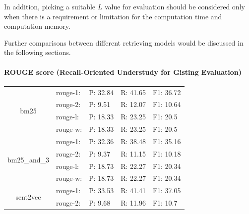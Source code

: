 \documentclass[10pt,a4paper,fleqn]{report}
\begin{document}
					In addition, picking a suitable $L$ value for evaluation should be considered only when there is a requirement or limitation for the computation time and computation memory. 
					
					Further comparisons between different retrieving models would be discussed in the following sections.
				
				\paragraph{ROUGE score (Recall-Oriented Understudy for Gisting Evaluation) }
				
					\begin{table}[htbp]
						\centering
						\begin{tabular}{crrrr}
							\toprule
							\multirow{4}[2]{*}{bm25} & \multicolumn{1}{l}{rouge-1:} & \multicolumn{1}{l}{P: 32.84} & \multicolumn{1}{l}{R: 41.65} & \multicolumn{1}{l}{F1: 36.72} \\
							& \multicolumn{1}{l}{rouge-2:} & \multicolumn{1}{l}{P: 9.51} & \multicolumn{1}{l}{R: 12.07} & \multicolumn{1}{l}{F1: 10.64} \\
							& \multicolumn{1}{l}{rouge-l:} & \multicolumn{1}{l}{P: 18.33} & \multicolumn{1}{l}{R: 23.25} & \multicolumn{1}{l}{F1: 20.5} \\
							& \multicolumn{1}{l}{rouge-w:} & \multicolumn{1}{l}{P: 18.33} & \multicolumn{1}{l}{R: 23.25} & \multicolumn{1}{l}{F1: 20.5} \\
							\midrule
							\multirow{4}[2]{*}{bm25\_and\_3} & \multicolumn{1}{l}{rouge-1:} & \multicolumn{1}{l}{P: 32.36} & \multicolumn{1}{l}{R: 38.48} & \multicolumn{1}{l}{F1: 35.16} \\
							& \multicolumn{1}{l}{rouge-2:} & \multicolumn{1}{l}{P: 9.37} & \multicolumn{1}{l}{R: 11.15} & \multicolumn{1}{l}{F1: 10.18} \\
							& \multicolumn{1}{l}{rouge-l:} & \multicolumn{1}{l}{P: 18.73} & \multicolumn{1}{l}{R: 22.27} & \multicolumn{1}{l}{F1: 20.34} \\
							& \multicolumn{1}{l}{rouge-w:} & \multicolumn{1}{l}{P: 18.73} & \multicolumn{1}{l}{R: 22.27} & \multicolumn{1}{l}{F1: 20.34} \\
							\midrule
							\multirow{4}[2]{*}{sent2vec} & \multicolumn{1}{l}{rouge-1:} & \multicolumn{1}{l}{P: 33.53} & \multicolumn{1}{l}{R: 41.41} & \multicolumn{1}{l}{F1: 37.05} \\
							& \multicolumn{1}{l}{rouge-2:} & \multicolumn{1}{l}{P: 9.68} & \multicolumn{1}{l}{R: 11.96} & \multicolumn{1}{l}{F1: 10.7} \\

\end{tabular}
\end{table}
\end{document}
